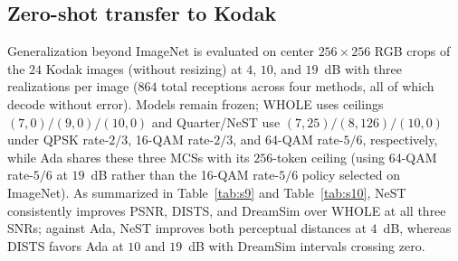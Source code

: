 \documentclass[10pt,letterpaper]{article}
\begin{document}
\subsection{Zero-shot transfer to Kodak}
Generalization beyond ImageNet is evaluated on center $256\times 256$ RGB crops of the $24$ Kodak images (without resizing) at $4$, $10$, and $19$~dB with three realizations per image ($864$ total receptions across four methods, all of which decode without error). Models remain frozen; WHOLE uses ceilings $(7,0)/(9,0)/(10,0)$ and Quarter/NeST use $(7,25)/(8,126)/(10,0)$ under QPSK rate-$2/3$, 16-QAM rate-$2/3$, and 64-QAM rate-$5/6$, respectively, while Ada shares these three MCSs with its $256$-token ceiling (using 64-QAM rate-$5/6$ at $19$~dB rather than the 16-QAM rate-$5/6$ policy selected on ImageNet). As summarized in Table~\ref{tab:s9} and Table~\ref{tab:s10}, NeST consistently improves PSNR, DISTS, and DreamSim over WHOLE at all three SNRs; against Ada, NeST improves both perceptual distances at $4$~dB, whereas DISTS favors Ada at $10$ and $19$~dB with DreamSim intervals crossing zero.
\end{document}
